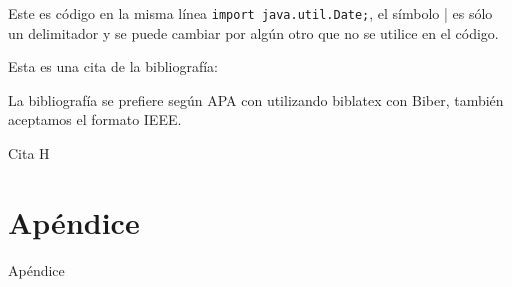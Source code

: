 \documentclass[fleqn]{Paquetes/RevDigMatEduInt}
\begin{document}
Este es código en la misma línea \lstinline|import java.util.Date;|, el símbolo | es sólo un delimitador y se puede cambiar por algún otro que no se utilice en el código.



Esta es una cita de la bibliografía: \cite{H}

La bibliografía se prefiere según APA con utilizando biblatex con Biber, también aceptamos el formato IEEE.



\begin{thebibliography}{AAAAA}
	 Cita H
\end{thebibliography}

\appendix

\section{Apéndice}

Apéndice
\end{document}
